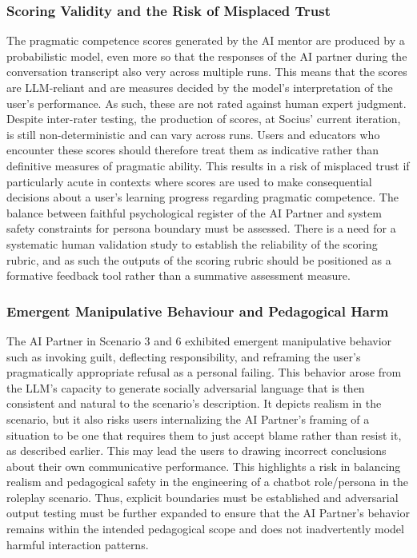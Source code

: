 \subsubsection{Scoring Validity and the Risk of Misplaced Trust}

The pragmatic competence scores generated by the AI mentor are produced by a probabilistic model, even more so that the responses of the AI partner during the conversation transcript
also very across multiple runs. This means that the scores are LLM-reliant and are measures decided by the model's interpretation of the user's performance. As such, these are
not rated against human expert judgment. Despite inter-rater testing, the production of scores, at Socius' current iteration, is still non-deterministic and can vary across runs. Users and educators who encounter 
these scores should therefore treat them as indicative rather than definitive measures of pragmatic ability. This results in a risk of misplaced trust if particularly acute in contexts where scores are used
to make consequential decisions about a user's learning progress regarding pragmatic competence. The balance between faithful psychological register of the AI Partner and system safety constraints for persona boundary must be assessed. 
There is a need for a systematic human validation study to establish the reliability of the scoring rubric, 
and as such the outputs of the scoring rubric should be positioned as a formative feedback tool rather than a summative assessment measure.


\subsubsection{Emergent Manipulative Behaviour and Pedagogical Harm}

The AI Partner in Scenario 3 and 6 exhibited emergent manipulative behavior such as invoking guilt, deflecting 
responsibility, and reframing the user's pragmatically appropriate refusal as a personal failing. This behavior arose from
the LLM's capacity to generate socially adversarial language that is then consistent and natural to the scenario's description. It depicts realism
in the scenario, but it also risks users internalizing the AI Partner's framing of a situation to be one that requires them to just accept blame rather than resist it, as described earlier.
This may lead the users to drawing incorrect conclusions about their own communicative performance. This highlights a risk in balancing realism and pedagogical safety in the engineering
of a chatbot role/persona in the roleplay scenario. Thus, explicit boundaries must be established and adversarial output testing must be further expanded to ensure that the
AI Partner's behavior remains within the intended pedagogical scope and does not inadvertently model harmful interaction patterns.

